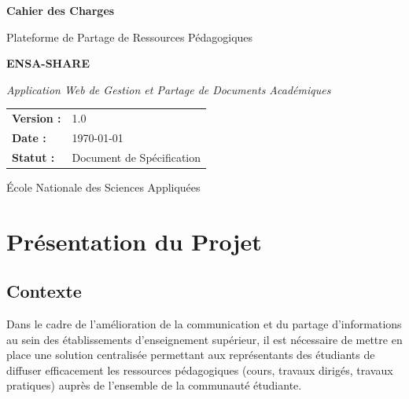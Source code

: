 \documentclass[12pt,a4paper]{article}
\begin{document}
\begin{titlepage}
    \centering
    \vspace*{2cm}
    
    {\Huge\bfseries Cahier des Charges\par}
    \vspace{0.5cm}
    {\LARGE Plateforme de Partage de Ressources Pédagogiques\par}
    \vspace{0.3cm}
    {\Large\textbf{ENSA-SHARE}\par}
    
    \vspace{2cm}
    
    {\large\textit{Application Web de Gestion et Partage de Documents Académiques}\par}
    
    \vspace{3cm}
    
    \begin{tabular}{ll}
        \textbf{Version :} & 1.0 \\
        \textbf{Date :} & \today \\
        \textbf{Statut :} & Document de Spécification \\
    \end{tabular}
    
    \vfill
    
    {\large École Nationale des Sciences Appliquées\par}
    
\end{titlepage}

\tableofcontents
\newpage

\section{Présentation du Projet}

\subsection{Contexte}

Dans le cadre de l'amélioration de la communication et du partage d'informations au sein des établissements d'enseignement supérieur, il est nécessaire de mettre en place une solution centralisée permettant aux représentants des étudiants de diffuser efficacement les ressources pédagogiques (cours, travaux dirigés, travaux pratiques) auprès de l'ensemble de la communauté étudiante.
\end{document}
